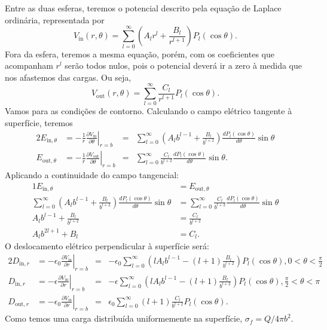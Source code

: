 \documentclass{article}
\begin{document}
Entre as duas esferas, teremos o potencial descrito pela equação de Laplace ordinária, representada por
\begin{equation}
 V_{\mathrm{in}}(r,\theta) = \sum_{l=0}^{\infty} \left( A_l r^l + \frac{B_l}{r^{l+1}}\right) P_l(\cos{\theta})\mathrm{.}
\end{equation}
Fora da esfera, teremos a mesma equação, porém, com os coeficientes que acompanham $r^l$ serão todos nulos, pois o potencial deverá ir a zero à medida que nos
afastemos das cargas. Ou seja,
\begin{equation}
 V_{\mathrm{out}}(r,\theta) = \sum_{l=0}^{\infty} \frac{C_l}{r^{l+1}} P_l(\cos{\theta})\mathrm{.}
\end{equation}
Vamos para as condições de contorno. Calculando o campo elétrico tangente à superfície, teremos
\begin{alignat}{2}
 E_{\mathrm{in},\theta} &= \left. - \frac{1}{r}\frac{\partial V_{\mathrm{in}}}{\partial \theta}\right\rvert_{r=b} &=&
 \sum_{l=0}^{\infty} \left( A_l b^{l-1} + \frac{B_l}{b^{l+2}}\right) \frac{d P_l(\cos{\theta})}{d\theta}\sin{\theta} \\
 E_{\mathrm{out},\theta} &= \left. - \frac{1}{r}\frac{\partial V_{\mathrm{out}}}{\partial \theta}\right\rvert_{r=b} &=&
 \sum_{l=0}^{\infty} \frac{C_l}{b^{l+2}} \frac{d P_l(\cos{\theta})}{d\theta}\sin{\theta}\mathrm{.}
\end{alignat}
Aplicando a continuidade do campo tangencial:
\begin{alignat}{1}
 E_{\mathrm{in},\theta} &= E_{\mathrm{out},\theta}\\
 \sum_{l=0}^{\infty} \left( A_l b^{l-1} + \frac{B_l}{b^{l+2}}\right) \frac{d P_l(\cos{\theta})}{d\theta}\sin{\theta} &=
 \sum_{l=0}^{\infty} \frac{C_l}{b^{l+2}} \frac{d P_l(\cos{\theta})}{d\theta}\sin{\theta} \\
 A_l b^{l-1} + \frac{B_l}{b^{l+2}} &= \frac{C_l}{b^{l+2}}\\
 A_l b^{2l+1} + B_l &= C_l\mathrm{.}
\end{alignat}
O deslocamento elétrico perpendicular à superfície será:
\begin{alignat}{2}
 D_{\mathrm{in},r} &= \left. - \epsilon_0 \frac{\partial V_{\mathrm{in}}}{\partial r} \right\rvert_{r=b} &=&
 -\epsilon_0 \sum_{l=0}^{\infty} \left( l A_l b^{l-1} - (l+1) \frac{B_l}{b^{l+2}}\right) P_l(\cos{\theta}), 0 < \theta < \frac{\pi}{2}\\
 D_{\mathrm{in},r} &= \left. - \epsilon \frac{\partial V_{\mathrm{in}}}{\partial r} \right\rvert_{r=b} &=&
 -\epsilon \sum_{l=0}^{\infty} \left( l A_l b^{l-1} - (l+1) \frac{B_l}{b^{l+2}}\right) P_l(\cos{\theta}), \frac{\pi}{2} < \theta < \pi\\
 D_{\mathrm{out},r} &= \left. - \epsilon_0 \frac{\partial V_{\mathrm{in}}}{\partial r} \right\rvert_{r=b} &=&
 \epsilon_0 \sum_{l=0}^{\infty} (l+1)\frac{C_l}{b^{l+2}} P_l(\cos{\theta})\mathrm{.}
\end{alignat}
Como temos uma carga distribuída uniformemente na superfície, $\sigma_f = Q\slash 4\pi b^2$.
\end{document}
